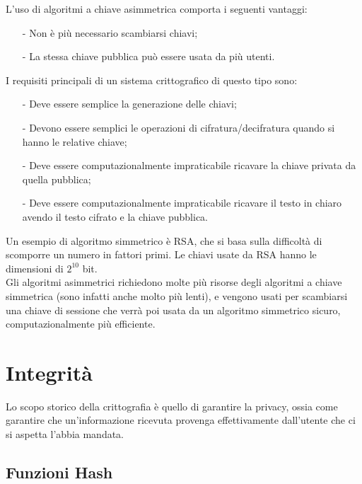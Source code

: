 \documentclass[a4paper, 10pt]{report}
\begin{document}
\noindent L'uso di algoritmi a chiave asimmetrica comporta i seguenti vantaggi:
		\begin{itemize}
			\item[-] Non è più necessario scambiarsi chiavi;
			\item[-] La stessa chiave pubblica può essere usata da più utenti.
		\end{itemize}
	
\noindent I requisiti principali di un sistema crittografico di questo tipo sono:
		\begin{itemize}
			\item[-] Deve essere semplice la generazione delle chiavi;
			\item[-] Devono essere semplici le operazioni di cifratura/decifratura quando si hanno le relative chiave;
			\item[-] Deve essere computazionalmente impraticabile ricavare la chiave privata da quella pubblica;
			\item[-] Deve essere computazionalmente impraticabile ricavare il testo in chiaro avendo il testo cifrato e la chiave pubblica.
		\end{itemize}
\noindent Un esempio di algoritmo simmetrico è RSA, che si basa sulla difficoltà di scomporre un numero in fattori primi. Le chiavi usate da RSA hanno le dimensioni di $2^{10}$ bit. \\
		
\noindent Gli algoritmi asimmetrici richiedono molte più risorse degli algoritmi a chiave simmetrica (sono infatti anche molto più lenti), e vengono usati per scambiarsi una chiave di sessione che verrà poi usata da un algoritmo simmetrico sicuro, computazionalmente più efficiente.
		
		\section{Integrità}
		Lo scopo storico della crittografia è quello di garantire la privacy, ossia come garantire che un'informazione ricevuta provenga effettivamente dall'utente che ci si aspetta l'abbia mandata.
		
		\subsection{Funzioni Hash}
\end{document}
